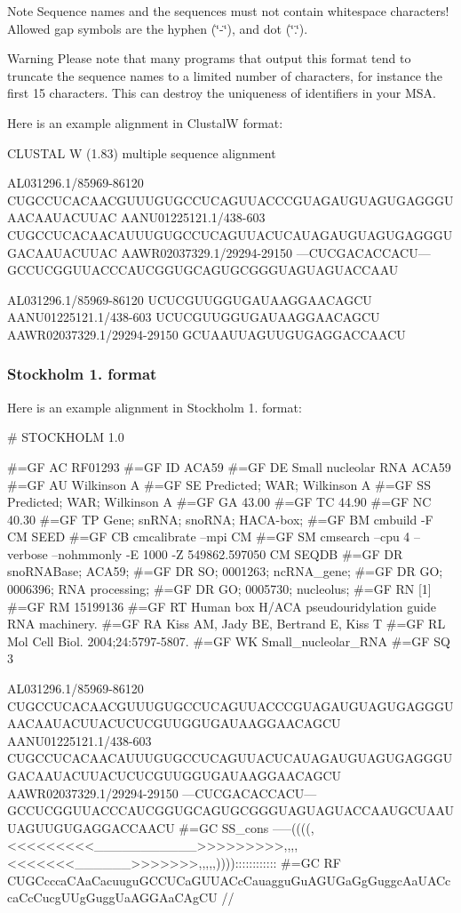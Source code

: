 \begin{DoxyNote}{Note}
Sequence names and the sequences must not contain whitespace characters! Allowed gap symbols are the hyphen {\itshape }(\char`\"{}-\/\char`\"{}), and dot {\itshape }(\char`\"{}.\char`\"{}).
\end{DoxyNote}
\begin{DoxyWarning}{Warning}
Please note that many programs that output this format tend to truncate the sequence names to a limited number of characters, for instance the first 15 characters. This can destroy the uniqueness of identifiers in your M\+SA.
\end{DoxyWarning}
Here is an example alignment in ClustalW format\+: 
\begin{DoxyVerbInclude}
CLUSTAL W (1.83) multiple sequence alignment


AL031296.1/85969-86120      CUGCCUCACAACGUUUGUGCCUCAGUUACCCGUAGAUGUAGUGAGGGUAACAAUACUUAC
AANU01225121.1/438-603      CUGCCUCACAACAUUUGUGCCUCAGUUACUCAUAGAUGUAGUGAGGGUGACAAUACUUAC
AAWR02037329.1/29294-29150  ---CUCGACACCACU---GCCUCGGUUACCCAUCGGUGCAGUGCGGGUAGUAGUACCAAU

AL031296.1/85969-86120      UCUCGUUGGUGAUAAGGAACAGCU
AANU01225121.1/438-603      UCUCGUUGGUGAUAAGGAACAGCU
AAWR02037329.1/29294-29150  GCUAAUUAGUUGUGAGGACCAACU 
\end{DoxyVerbInclude}
\hypertarget{file_formats_msa-formats-stockholm}{}\subsubsection{Stockholm 1. format}\label{file_formats_msa-formats-stockholm}
Here is an example alignment in Stockholm 1. format\+: 
\begin{DoxyVerbInclude}
# STOCKHOLM 1.0

#=GF AC   RF01293
#=GF ID   ACA59
#=GF DE   Small nucleolar RNA ACA59
#=GF AU   Wilkinson A
#=GF SE   Predicted; WAR; Wilkinson A
#=GF SS   Predicted; WAR; Wilkinson A
#=GF GA   43.00
#=GF TC   44.90
#=GF NC   40.30
#=GF TP   Gene; snRNA; snoRNA; HACA-box;
#=GF BM   cmbuild -F CM SEED
#=GF CB   cmcalibrate --mpi CM
#=GF SM   cmsearch --cpu 4 --verbose --nohmmonly -E 1000 -Z 549862.597050 CM SEQDB
#=GF DR   snoRNABase; ACA59;
#=GF DR   SO; 0001263; ncRNA_gene;
#=GF DR   GO; 0006396; RNA processing;
#=GF DR   GO; 0005730; nucleolus;
#=GF RN   [1]
#=GF RM   15199136
#=GF RT   Human box H/ACA pseudouridylation guide RNA machinery.
#=GF RA   Kiss AM, Jady BE, Bertrand E, Kiss T
#=GF RL   Mol Cell Biol. 2004;24:5797-5807.
#=GF WK   Small_nucleolar_RNA
#=GF SQ   3


AL031296.1/85969-86120     CUGCCUCACAACGUUUGUGCCUCAGUUACCCGUAGAUGUAGUGAGGGUAACAAUACUUACUCUCGUUGGUGAUAAGGAACAGCU
AANU01225121.1/438-603     CUGCCUCACAACAUUUGUGCCUCAGUUACUCAUAGAUGUAGUGAGGGUGACAAUACUUACUCUCGUUGGUGAUAAGGAACAGCU
AAWR02037329.1/29294-29150 ---CUCGACACCACU---GCCUCGGUUACCCAUCGGUGCAGUGCGGGUAGUAGUACCAAUGCUAAUUAGUUGUGAGGACCAACU
#=GC SS_cons               -----((((,<<<<<<<<<___________>>>>>>>>>,,,,<<<<<<<______>>>>>>>,,,,,))))::::::::::::
#=GC RF                    CUGCcccaCAaCacuuguGCCUCaGUUACcCauagguGuAGUGaGgGuggcAaUACccaCcCucgUUgGuggUaAGGAaCAgCU
//
\end{DoxyVerbInclude}


